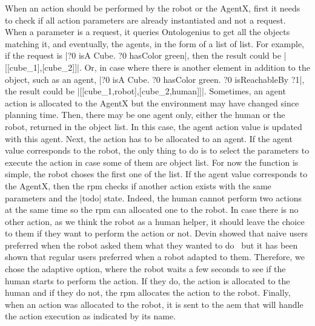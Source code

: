 \documentclass[a4paper,11pt,twoside]{StyleThese}
\begin{document}
When an action should be performed by the robot or the AgentX, first it needs to check if all action parameters are already instantiated and not a \sparql{} request. When a parameter is a \sparql{} request, it queries Ontologenius to get all the objects matching it, and eventually, the agents, in the form of a list of list. For example, if the \sparql{} request is |?0 isA Cube. ?0 hasColor green|, then the result could be |[[cube\_1],[cube\_2]]|. Or, in case where there is another element in addition to the object, such as an agent, \eg |?0 isA Cube. ?0 hasColor green. ?0 isReachableBy ?1|, the result could be |[[cube\_1,robot],[cube\_2,human]]|. Sometimes, an agent action is allocated to the AgentX but the environment may have changed since planning time. Then, there may be one agent only, either the human or the robot, returned in the object list. In this case, the agent action value is updated with this agent. Next, the action has to be allocated to an agent. If the agent value corresponds to the robot, the only thing to do is to select the parameters to execute the action in case some of them are object list. For now the function is simple, the robot choses the first one of the list. If the agent value corresponds to the AgentX, then the \acrshort{rpm} checks if another action exists with the same parameters and the |todo| state. Indeed, the human cannot perform two actions at the same time so the \acrshort{rpm} can allocated one to the robot. In case there is no other action, as we think the robot as a human helper, it should leave the choice to them if they want to perform the action or not. Devin showed that naive users preferred when the robot asked them what they wanted to do~\cite{devin_2017_decisions} but it has been shown that regular users preferred when a robot adapted to them. Therefore, we chose the adaptive option, where the robot waits a few seconds to see if the human starts to perform the action. If they do, the action is allocated to the human and if they do not, the \acrshort{rpm} allocates the action to the robot. Finally, when an action was allocated to the robot, it is sent to the \acrlong{aem} that will handle the action execution as indicated by its name.
\end{document}
